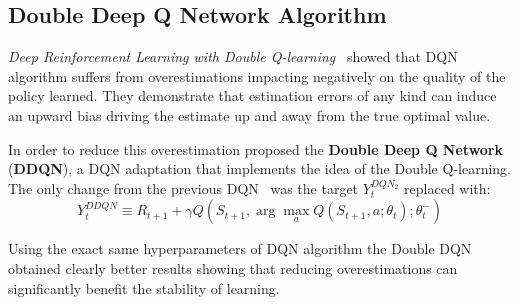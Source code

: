\subsection{Double Deep Q Network Algorithm}

\textit{Deep Reinforcement Learning with Double Q-learning}~\cite{Hasselt:2016:DRL:3016100.3016191} showed that DQN algorithm suffers from overestimations impacting negatively on the quality of the policy learned. They demonstrate that estimation errors of any kind can induce an upward bias driving the estimate up and away from the true optimal value.

In order to reduce this overestimation \citeauthor{Hasselt:2016:DRL:3016100.3016191}  proposed the \textbf{Double Deep Q Network} (\textbf{DDQN}), a DQN adaptation that implements the idea of the Double Q-learning. The only change from the previous DQN~\cite{Mnih2015} was the target $Y_t^{DQN_2}$ replaced with:
\begin{equation}
	Y^{DDQN}_t \equiv R_{t+1} + \gamma Q(S_{t+1}, 
		\arg\max_{a} Q(S_{t+1}, a; \theta_t); \theta_t^-)
\end{equation}

Using the exact same hyperparameters of DQN algorithm the Double DQN obtained clearly better results showing that reducing overestimations can significantly benefit the stability of learning.


